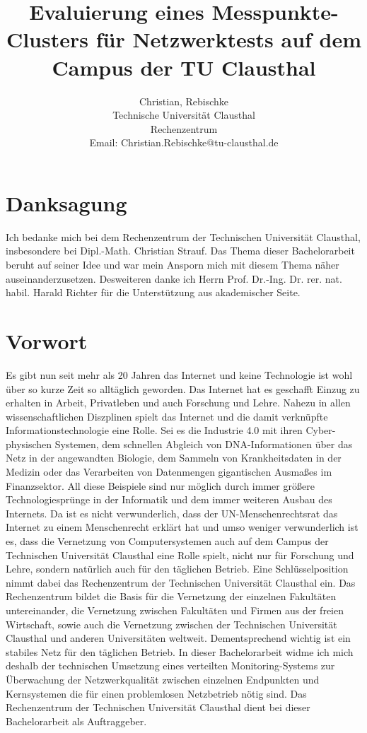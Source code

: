 \documentclass[titlepage]{report}
\title{Evaluierung eines Messpunkte-Clusters für Netzwerktests auf dem
Campus der TU Clausthal}
\author{Christian, Rebischke\\
Technische Universität Clausthal\\
Rechenzentrum\\
Email: Christian.Rebischke@tu-clausthal.de}
\begin{document}
\maketitle
\chapter*{Danksagung}
Ich bedanke mich bei dem Rechenzentrum der Technischen Universität
Clausthal, insbesondere bei Dipl.\hyp{}Math. Christian Strauf. Das Thema
dieser Bachelorarbeit beruht auf seiner Idee und war mein Ansporn mich
mit diesem Thema näher auseinanderzusetzen. Desweiteren danke ich Herrn
Prof. Dr.\hyp{}Ing. Dr. rer. nat. habil. Harald Richter für die Unterstützung
aus akademischer Seite.
\tableofcontents
\chapter*{Vorwort}
Es gibt nun seit mehr als 20 Jahren das Internet und keine Technologie
ist wohl über so kurze Zeit so alltäglich geworden. Das Internet hat es
geschafft Einzug zu erhalten in Arbeit, Privatleben und auch Forschung
und Lehre. Nahezu in allen wissenschaftlichen Diszplinen spielt das
Internet und die damit verknüpfte Informationstechnologie eine Rolle.
Sei es die Industrie 4.0 mit ihren Cyber-physischen Systemen, dem
schnellen Abgleich von DNA-Informationen über das Netz in der
angewandten Biologie, dem Sammeln von Krankheitsdaten in der Medizin
oder das Verarbeiten von Datenmengen gigantischen Ausmaßes im
Finanzsektor. All diese Beispiele sind nur möglich durch immer größere
Technologiesprünge in der Informatik und dem immer weiteren Ausbau des
Internets. Da ist es nicht verwunderlich, dass der UN-Menschenrechtsrat das
Internet zu einem Menschenrecht\cite{UNHRC} erklärt hat und umso weniger
verwunderlich ist es, dass die Vernetzung von Computersystemen auch auf
dem Campus der Technischen Universität Clausthal eine Rolle spielt,
nicht nur für Forschung und Lehre, sondern natürlich auch für den
täglichen Betrieb. Eine Schlüsselposition nimmt dabei das Rechenzentrum
der Technischen Universität Clausthal ein. Das Rechenzentrum bildet die
Basis für die Vernetzung der einzelnen Fakultäten untereinander, die
Vernetzung zwischen Fakultäten und Firmen aus der freien Wirtschaft,
sowie auch die Vernetzung zwischen der Technischen Universität Clausthal
und anderen Universitäten weltweit. Dementsprechend wichtig ist ein
stabiles Netz für den täglichen Betrieb. In dieser Bachelorarbeit widme
ich mich deshalb der technischen Umsetzung eines verteilten
Monitoring-Systems zur Überwachung der Netzwerkqualität zwischen
einzelnen Endpunkten und Kernsystemen die für einen problemlosen
Netzbetrieb nötig sind. Das Rechenzentrum der Technischen Universität
Clausthal dient bei dieser Bachelorarbeit als Auftraggeber.
\end{document}
